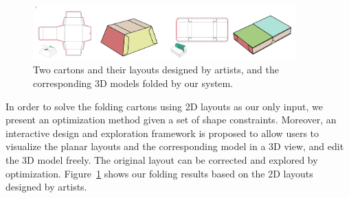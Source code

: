 \begin{figure}
	\centering
	\includegraphics[width=0.9\textwidth]{images/artist}
	\caption{Two cartons and their layouts designed by artists, and the corresponding 3D models folded by our system.}
	\label{fig:artist}
\end{figure}




%
 
 
In order to solve the folding cartons using 2D layouts as our only input, we present an optimization method given a set of shape constraints.
Moreover, an interactive design and exploration framework is proposed to allow users to visualize the planar layouts and the corresponding model in a 3D view, and edit the 3D model freely. The original layout can be corrected and explored by optimization. Figure~\ref{fig:artist} shows our folding results based on the 2D layouts designed by artists. 

